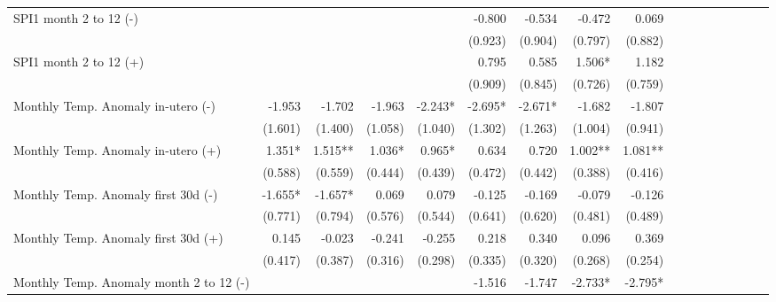 \begin{table}[H]
\begin{adjustbox}{max width=\linewidth}
\begin{tabular}{lrrrrrrrrrrrrrrrr}
SPI1 month 2 to 12  (-)                      &              &             &             &              &       -0.800 &       -0.534  &        -0.472 &        0.069 \\
                                             &              &             &             &              &      (0.923) &      (0.904)  &       (0.797) &      (0.882) \\
SPI1 month 2 to 12  (+)                      &              &             &             &              &        0.795 &        0.585  &        1.506* &        1.182 \\
                                             &              &             &             &              &      (0.909) &      (0.845)  &       (0.726) &      (0.759) \\
Monthly Temp. Anomaly in-utero   (-)         &       -1.953 &      -1.702 &      -1.963 &     -2.243*  &      -2.695* &      -2.671*  &        -1.682 &       -1.807 \\
                                             &      (1.601) &     (1.400) &     (1.058) &     (1.040)  &      (1.302) &      (1.263)  &       (1.004) &      (0.941) \\
Monthly Temp. Anomaly in-utero  (+)          &       1.351* &     1.515** &      1.036* &      0.965*  &        0.634 &        0.720  &       1.002** &      1.081** \\
                                             &      (0.588) &     (0.559) &     (0.444) &     (0.439)  &      (0.472) &      (0.442)  &       (0.388) &      (0.416) \\
Monthly Temp. Anomaly first 30d   (-)        &      -1.655* &     -1.657* &       0.069 &       0.079  &       -0.125 &       -0.169  &        -0.079 &       -0.126 \\
                                             &      (0.771) &     (0.794) &     (0.576) &     (0.544)  &      (0.641) &      (0.620)  &       (0.481) &      (0.489) \\
Monthly Temp. Anomaly first 30d (+)          &        0.145 &      -0.023 &      -0.241 &      -0.255  &        0.218 &        0.340  &         0.096 &        0.369 \\
                                             &      (0.417) &     (0.387) &     (0.316) &     (0.298)  &      (0.335) &      (0.320)  &       (0.268) &      (0.254) \\
Monthly Temp. Anomaly month 2 to 12 (-)      &              &             &             &              &       -1.516 &       -1.747  &       -2.733* &      -2.795* \\

\end{tabular}
\end{adjustbox}
\end{table}
